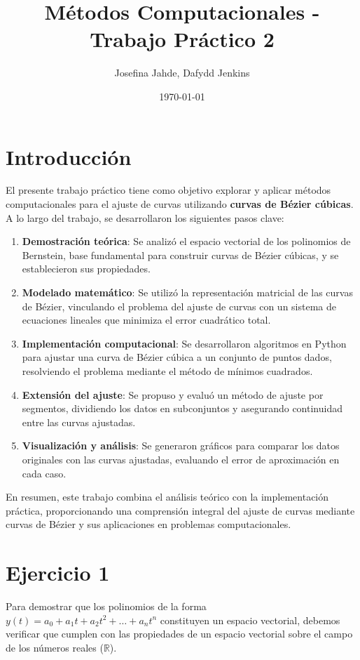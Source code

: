 \documentclass{article}
\title{Métodos Computacionales - Trabajo Práctico 2}
\author{Josefina Jahde, Dafydd Jenkins}
\date{\today}
\begin{document}
\maketitle

\section*{Introducción}

El presente trabajo práctico tiene como objetivo explorar y aplicar métodos computacionales para el ajuste de curvas utilizando \textbf{curvas de Bézier cúbicas}. A lo largo del trabajo, se desarrollaron los siguientes pasos clave:
\begin{enumerate}
    \item \textbf{Demostración teórica}: Se analizó el espacio vectorial de los polinomios de Bernstein, base fundamental para construir curvas de Bézier cúbicas, y se establecieron sus propiedades.
    \item \textbf{Modelado matemático}: Se utilizó la representación matricial de las curvas de Bézier, vinculando el problema del ajuste de curvas con un sistema de ecuaciones lineales que minimiza el error cuadrático total.
    \item \textbf{Implementación computacional}: Se desarrollaron algoritmos en Python para ajustar una curva de Bézier cúbica a un conjunto de puntos dados, resolviendo el problema mediante el método de mínimos cuadrados.
    \item \textbf{Extensión del ajuste}: Se propuso y evaluó un método de ajuste por segmentos, dividiendo los datos en subconjuntos y asegurando continuidad entre las curvas ajustadas.
    \item \textbf{Visualización y análisis}: Se generaron gráficos para comparar los datos originales con las curvas ajustadas, evaluando el error de aproximación en cada caso.
\end{enumerate}

En resumen, este trabajo combina el análisis teórico con la implementación práctica, proporcionando una comprensión integral del ajuste de curvas mediante curvas de Bézier y sus aplicaciones en problemas computacionales.

\section*{Ejercicio 1}

Para demostrar que los polinomios de la forma \( y(t) = a_0 + a_1 t + a_2 t^2 + \dots + a_n t^n \) constituyen un espacio vectorial, debemos verificar que cumplen con las propiedades de un espacio vectorial sobre el campo de los números reales (\(\mathbb{R}\)).
\end{document}
